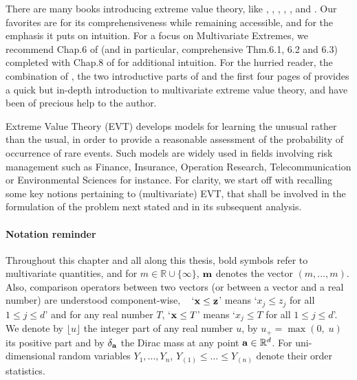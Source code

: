 There are many books introducing extreme value theory, like \cite{Leadbetter1983}, \cite{Resnick1987},  \cite{Coles2001}, \cite{BGTS04}, \cite{dHF06}, and \cite{Resnick2007}. Our favorites are \cite{Resnick2007} for its comprehensiveness while remaining accessible, and \cite{Coles2001} for the emphasis it puts on intuition. For a focus on Multivariate Extremes, we recommend Chap.6 of \cite{Resnick2007} (and in particular, comprehensive Thm.6.1, 6.2 and 6.3) completed with Chap.8 of \cite{Coles2001} for additional intuition.
%
For the hurried reader, the combination of
\cite{Segers12}, the two introductive parts of \cite{Einmahl2012} and the first four pages of  \cite{coles1991modeling} provides a quick but in-depth introduction to multivariate extreme value theory, and have been of precious help to the author.

Extreme Value Theory (\textsc{EVT}) develops models for learning the
unusual rather than the usual, in order to provide a reasonable
assessment of the probability of occurrence of rare events. Such models are widely used in fields
involving risk management such as Finance, Insurance, Operation Research, Telecommunication
or Environmental Sciences for instance. For clarity, we start off with recalling some key notions pertaining to (multivariate) \textsc{EVT}, that shall be involved in the formulation of the problem next stated and in its subsequent analysis. 

\paragraph{Notation reminder}
Throughout this chapter and all along this thesis, bold symbols refer to multivariate quantities, and for $m \in \mathbb{R}\cup \{\infty\}$, $\mathbf m$ denotes the vector $(m,\ldots,m)$.
Also, comparison operators  between two vectors (or between a vector and a real number) are
understood component-wise, \ie~ `$\mathbf x \le \mathbf z$' means `$x_j \le z_j$
for all $1\le j\le d$' and  for any real number $T$,  `$\mathbf x\le T$' means `$x_j \le T$ for all $1\le j\le d$'. 
We denote by $\lfloor u \rfloor$ the integer part of any real number $u$, by $u_+=\max(0,\; u)$ its positive part and by $\delta_{\mathbf a}$ the Dirac mass at any point $\mathbf a\in \mathbb{R}^d$.  
For uni-dimensional random variables $Y_1,\ldots,Y_n$, $Y_{(1)} \le \ldots\le Y_{(n)}$ denote their order statistics.


